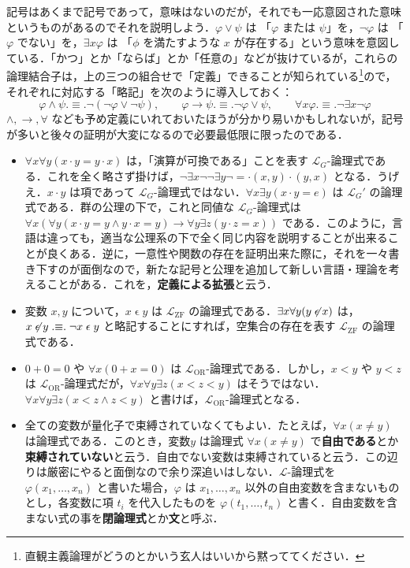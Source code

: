 \documentclass[a4j,xelatex,ja=standard]{ltjsarticle}
\newcommand{\defsym}{\mathrel{.{\equiv}.}}
\begin{document}
記号はあくまで記号であって，意味はないのだが，それでも一応意図された意味というものがあるのでそれを説明しよう．$\varphi \vee \psi$ は 「$\varphi$ または $\psi$」を，$\neg \varphi$ は 「$\varphi$ でない」を，$\exists x \varphi$ は 「$\phi$ を満たすような $x$ が存在する」という意味を意図している．「かつ」とか「ならば」とか「任意の」などが抜けているが，これらの論理結合子は，上の三つの組合せで「定義」できることが知られている\footnote{直観主義論理がどうのとかいう玄人はいいから黙っててください．}ので，それぞれに対応する「略記」を次のように導入しておく：
\[
 \varphi \wedge \psi \defsym \neg (\neg \varphi \vee \neg \psi), \qquad \varphi \rightarrow \psi \defsym \neg \varphi \vee \psi, \qquad
 \forall x \varphi \defsym \neg \exists x \neg \varphi
\]
$\wedge, \rightarrow, \forall$ なども予め定義にいれておいたほうが分かり易いかもしれないが，記号が多いと後々の証明が大変になるので必要最低限に限ったのである．

\begin{example}
 \begin{itemize}
  \item $\forall x \forall y (x \cdot y = y \cdot x)$ は，「演算が可換である」ことを表す $\mathcal{L}_G$-論理式である．これを全く略さず掛けば，$\neg \exists x \neg \neg \exists y \neg = \cdot(x, y) \cdot(y, x)$ となる．うげえ．$x \cdot y$ は項であって $\mathcal{L}_G$-論理式ではない．$\forall x \exists y (x \cdot y = e)$ は $\mathcal{L}_G'$ の論理式である．群の公理の下で，これと同値な $\mathcal{L}_G$-論理式は $\forall x (\forall y (x \cdot y = y \wedge y \cdot x = y) \rightarrow \forall y \exists z (y \cdot z = x))$ である．このように，言語は違っても，適当な公理系の下で全く同じ内容を説明することが出来ることが良くある．逆に，一意性や関数の存在を証明出来た際に，それを一々書き下すのが面倒なので，新たな記号と公理を追加して新しい言語・理論を考えることがある．これを，{\bfseries 定義による拡張}と云う．
  \item 変数 $x, y$ について，$x \mathrel{\epsilon} y$ は $\mathcal{L}_\mathrm{ZF}$ の論理式である．$\exists x \forall y (y \not\mathrel{\epsilon} x)$ は，$x \not\mathrel{\epsilon} y \defsym \neg x \mathrel{\epsilon} y$ と略記することにすれば，空集合の存在を表す $\mathcal{L}_\mathrm{ZF}$ の論理式である．
  \item $0 + 0 = 0$ や $\forall x (0 + x = 0)$ は $\mathcal{L}_\mathrm{OR}$-論理式である．しかし，$x < y$ や $y < z$ は $\mathcal{L}_\mathrm{OR}$-論理式だが，$\forall x \forall y \exists z (x < z < y)$ はそうではない．$\forall x \forall y \exists z (x < z \wedge z < y)$ と書けば，$\mathcal{L}_\mathrm{OR}$-論理式となる．
  \item 全ての変数が量化子で束縛されていなくてもよい．たとえば，$\forall x (x \neq y)$ は論理式である．このとき，変数$y$ は論理式 $\forall x (x \neq y)$ で{\bfseries 自由である}とか{\bfseries 束縛されていない}と云う．自由でない変数は束縛されていると云う．この辺りは厳密にやると面倒なので余り深追いはしない．$\mathcal{L}$-論理式を $\varphi(x_1, \dots, x_n)$ と書いた場合，$\varphi$ は $x_1, \dots, x_n$ 以外の自由変数を含まないものとし，各変数に項 $t_i$ を代入したものを $\varphi(t_1, \dots, t_n)$ と書く．自由変数を含まない式の事を{\bfseries 閉論理式}とか{\bfseries 文}と呼ぶ．
 \end{itemize}
\end{example}
\end{document}
